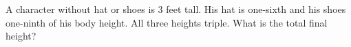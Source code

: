 A character without hat or shoes is 3 feet tall. His hat is one-sixth and his shoes one-ninth of his body height. All three heights triple. What is the total final height?
